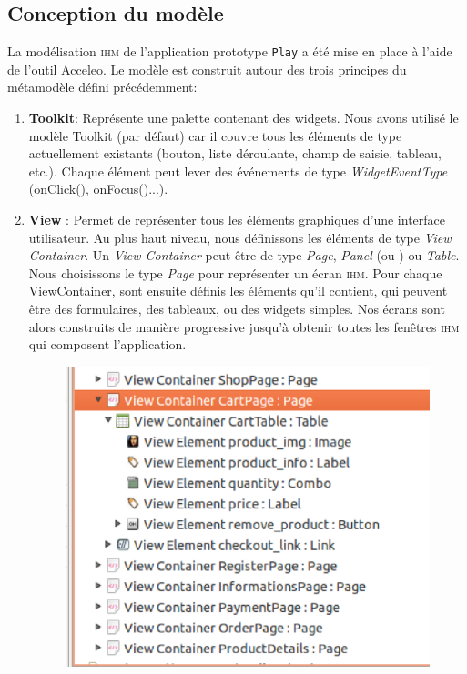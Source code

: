 \subsection{Conception du modèle}
La modélisation \textsc{ihm} de l'application prototype \texttt{Play} a été mise en place à l'aide de l'outil Acceleo. Le modèle est construit autour des trois principes du métamodèle défini précédemment:
\begin{enumerate}
\item \textbf{Toolkit}: Représente une palette contenant des widgets. Nous avons utilisé le modèle Toolkit (par défaut) car il couvre tous les éléments de type   actuellement existants (bouton, liste déroulante, champ de saisie, tableau, etc.). Chaque élément  peut lever des événements de type \textit{WidgetEventType} (onClick(), onFocus()...).
\item \textbf{View} : Permet de représenter tous les éléments graphiques d'une interface utilisateur. Au plus haut niveau, nous définissons les éléments de type \textit{View Container}. 
\newline
Un \textit{View Container} peut être de type \textit{Page}, \textit{Panel} (ou ) ou \textit{Table}. 
\newline
Nous choisissons le type \textit{Page} pour représenter un écran \textsc{ihm}. Pour chaque ViewContainer, sont ensuite définis les éléments qu'il contient, qui peuvent être des formulaires, des tableaux, ou des widgets simples. Nos écrans sont alors construits de manière progressive jusqu'à obtenir toutes les fenêtres \textsc{ihm} qui composent l'application.
\begin{figure}[H]
  \centering
  \includegraphics[scale=.4]{img/views.eps}

\end{figure}
\end{enumerate}
